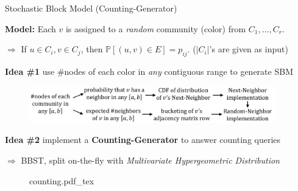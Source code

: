 \vspace{-0.3em}
\begin{block}{Stochastic Block Model (Counting-Generator)} %

\textbf{Model:} Each $v$ is assigned to a \emph{random} community (color) from $C_1, \ldots, C_r$.

\quad$\Rightarrow$ If $u\in C_i, v\in C_j$, then $\mathbb {P}[{(u, v)\in E}] = p_{ij}$.
($|C_i|$'s are given as input)

\vspace{15pt}

\colorbox{TealBlue}{\textbf{Idea \#1}} use \#nodes of each color in \emph{any} contiguous range to generate SBM

\begin{figure}[h]
    \centering
\includegraphics[clip, width=0.95\textwidth]{chart.pdf}
\end{figure}

\colorbox{TealBlue}{\textbf{Idea \#2}} implement a \textbf{Counting-Generator} to answer counting queries

\quad$\Rightarrow$ BBST, split on-the-fly with \emph{Multivariate Hypergeometric Distribution}

\vspace{0.5em}
\begin{figure}[h!]\centering
    \def\svgwidth{0.95\columnwidth}
    {counting.pdf_tex}
\end{figure}


\end{block}
